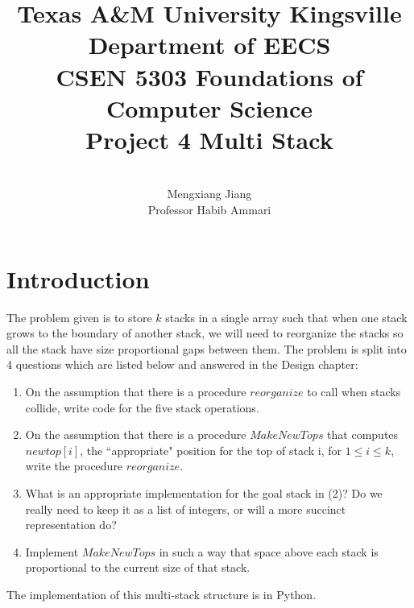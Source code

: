 \documentclass[12pt]{report}
\begin{document}
 
 
\title{Texas A\&M University Kingsville\\
Department of EECS\\
CSEN 5303 Foundations of Computer Science\\
Project 4 Multi Stack
}%
\author{\\
Mengxiang Jiang\\ %
Professor Habib Ammari} %
 
\maketitle

\tableofcontents

\chapter{Introduction}
The problem given is to store $k$ stacks in a single array such that when one stack grows
to the boundary of another stack, we will need to reorganize the stacks so all the stack have size proportional gaps between them.
The problem is split into 4 questions which are listed below and answered in the Design chapter:

\begin{enumerate}
    \item On the assumption that there is a procedure $reorganize$ to call when stacks collide, write
    code for the five stack operations. 
    \item On the assumption that there is a procedure $MakeNewTops$ that computes $newtop[i]$, the
    ``appropriate" position for the top of stack i, for $1 \leq i \leq k$, write the procedure $reorganize$.
    \item What is an appropriate implementation for the goal stack in (2)? Do we really need to keep
    it as a list of integers, or will a more succinct representation do?
    \item Implement $MakeNewTops$ in such a way that space above each stack is proportional to the
    current size of that stack. 
\end{enumerate}

The implementation of this multi-stack structure is in Python.
\end{document}
